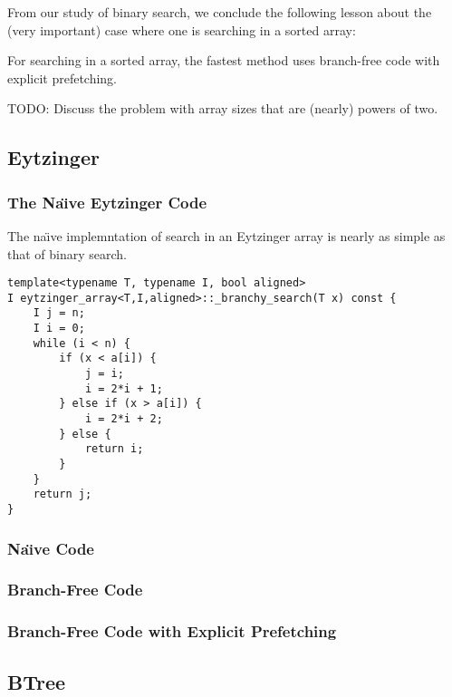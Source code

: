 \documentclass{patmorin}
\begin{document}
From our study of binary search, we conclude the following lesson about the (very important) case where one is searching in a sorted array:

\begin{lesson}
  For searching in a sorted array, the fastest method uses branch-free
  code with explicit prefetching.
\end{lesson}

TODO: Discuss the problem with array sizes that are (nearly) powers of two.

\subsection{Eytzinger}

\subsubsection{The Na\"{\i}ve Eytzinger Code}

The na\"{\i}ve implemntation of search in an Eytzinger array is nearly
as simple as that of binary search.

\begin{listing}
\begin{verbatim}
template<typename T, typename I, bool aligned>
I eytzinger_array<T,I,aligned>::_branchy_search(T x) const {
	I j = n;
	I i = 0;
	while (i < n) {
		if (x < a[i]) {
			j = i;
			i = 2*i + 1;
		} else if (x > a[i]) {
			i = 2*i + 2;
		} else {
			return i;
		}
	}
	return j;
}

\end{verbatim}
\end{listing}



\subsubsection{Na\"{\i}ve Code}

\subsubsection{Branch-Free Code}

\subsubsection{Branch-Free Code with Explicit Prefetching}

\subsection{BTree}
\end{document}
